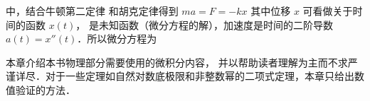 中，结合牛顿第二定律 和胡克定律得到 $ma = F = -kx$ 其中位移 $x$ 可看做关于时间的函数 $x(t)$， 是未知函数（微分方程的解），加速度是时间的二阶导数 $a(t) = x''(t)$．所以微分方程为 

本章介绍本书物理部分需要使用的微积分内容，
并以帮助读者理解为主而不求严谨详尽．对于一些定理如自然对数底极限和非整数幂的二项式定理，本章只给出数值验证的方法．



